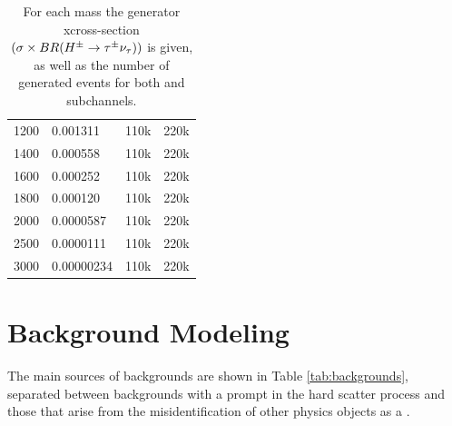 \begin{table}
{\begin{tabular}{| l | l | l | l |}
			1200 			& 0.001311 			& 110k 						& 220k							\\
			1400 			& 0.000558 			& 110k 						& 220k							\\
			1600 			& 0.000252 			& 110k 						& 220k							\\
			1800 			& 0.000120 			& 110k 						& 220k							\\
			2000 			& 0.0000587 		& 110k 						& 220k							\\
			2500 			& 0.0000111			& 110k 						& 220k							\\
			3000 			& 0.00000234		& 110k 						& 220k							\\ \hline
			\end{tabular}}
			\caption{For each \Hpm mass the generator xcross-section $(\sigma \times BR(H^{\pm} \rightarrow \tau^{\pm} \nu_{\tau}))$ is given, as well as the number of generated events for both \taulep and \taujets subchannels.}
			\label{tab:signal-generated}
		\end{table}
		\pagebreak

	\section{Background Modeling}\label{sec:bkg-modeling}
		The main sources of backgrounds are shown in Table \ref{tab:backgrounds}, separated between backgrounds with a prompt \tauhad in the hard scatter process and those that arise from the misidentification of other physics objects as a \tauhad.

    \begin{table}
      \centering
      \caption{Dominant backgrounds from prompt \tauhad and fake \tauhad candidates.}
      \label{tab:backgrounds}
    \end{table}

